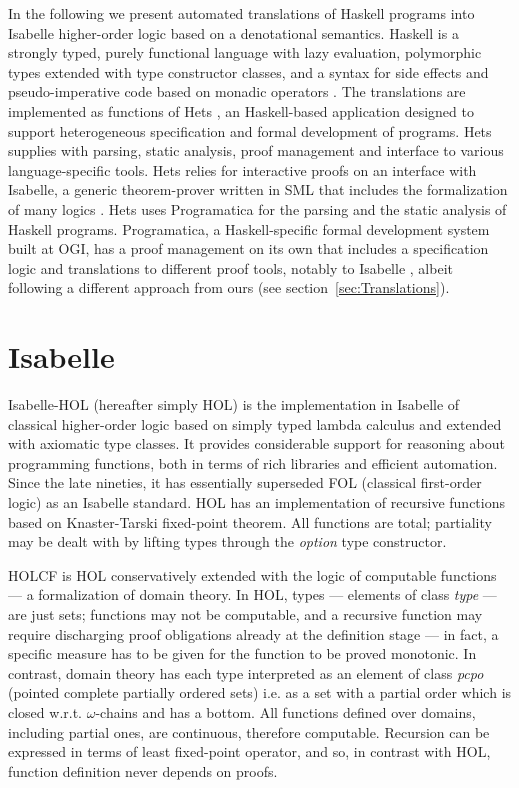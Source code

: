 \documentclass{llncs}
\begin{document}
In the following we present automated translations of Haskell programs
into Isabelle higher-order logic based on a denotational semantics.
Haskell is a strongly typed, purely functional language with lazy
evaluation, polymorphic types extended with type constructor classes,
and a syntax for side effects and pseudo-imperative code based on
monadic operators \cite{HaskellRep}.  The translations are implemented
as functions of Hets \cite{Hets}, an Haskell-based application
designed to support heterogeneous specification and formal development
of programs. Hets supplies with parsing, static analysis, proof
management and interface to various language-specific tools.  Hets
relies for interactive proofs on an interface with Isabelle, a generic
theorem-prover written in SML that includes the formalization of many
logics \cite{Paulson94isa}. Hets uses Programatica \cite{Prog04} for
the parsing and the static analysis of Haskell programs.
Programatica, a Haskell-specific formal development system built at
OGI, has a proof management on its own that includes a specification
logic and translations to different proof tools, notably to Isabelle
\cite{Huff}, albeit following a different approach from ours (see
section~\ref{sec:Translations}).


\section{Isabelle}

Isabelle-HOL (hereafter simply HOL) is the implementation in Isabelle
of classical higher-order logic based on simply typed lambda calculus
and extended with axiomatic type classes. It provides considerable
support for reasoning about programming functions, both in terms of
rich libraries and efficient automation. Since the late nineties, it
has essentially superseded FOL (classical first-order logic) as an
Isabelle standard. HOL has an implementation of recursive functions
based on Knaster-Tarski fixed-point theorem. All functions are total;
partiality may be dealt with by lifting types through the
\emph{option} type constructor.

HOLCF \cite{holcf} is HOL conservatively extended with the logic of
computable functions --- a formalization of domain theory. In HOL,
types --- elements of class \emph{type} --- are just sets; functions
may not be computable, and a recursive function may require
discharging proof obligations already at the definition stage --- in
fact, a specific measure has to be given for the function to be proved
monotonic.  In contrast, domain theory has each type interpreted as an
element of class \emph{pcpo} (pointed complete partially ordered sets)
i.e. as a set with a partial order which is closed w.r.t.
$\omega$-chains and has a bottom. All functions defined over domains,
including partial ones, are continuous, therefore computable.
Recursion can be expressed in terms of least fixed-point operator, and
so, in contrast with HOL, function definition never depends on proofs.
\end{document}
